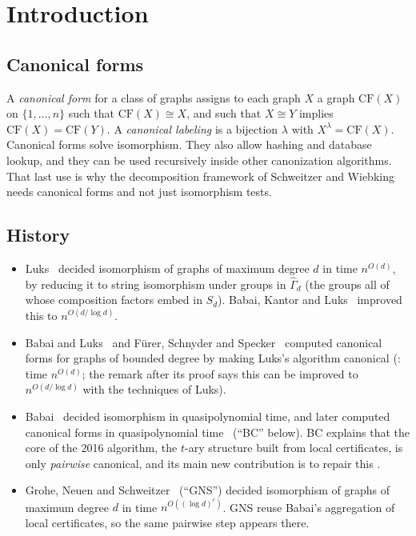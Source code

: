 \documentclass[11pt]{article}
\theoremstyle{plain}
\theoremstyle{definition}
\theoremstyle{remark}
\theoremstyle{named}
\theoremstyle{namedrm}
\newcommand{\Gd}{\widehat{\Gamma}_d}
\begin{document}
\tableofcontents

\section{Introduction}\label{sec:intro}

\subsection{Canonical forms}

A \emph{canonical form} for a class of graphs assigns to each graph $X$ a graph $\mathrm{CF}(X)$ on
$\{1,\dots,n\}$ such that $\mathrm{CF}(X)\cong X$, and such that $X\cong Y$ implies
$\mathrm{CF}(X)=\mathrm{CF}(Y)$. A \emph{canonical labeling} is a bijection $\lambda$ with
$X^\lambda=\mathrm{CF}(X)$. Canonical forms solve isomorphism. They also allow hashing and database
lookup, and they can be used recursively inside other canonization algorithms. That last use is why the
decomposition framework of Schweitzer and Wiebking~\cite{SW19,Wie21} needs canonical forms and not
just isomorphism tests.

\subsection{History}

\begin{itemize}
\item Luks~\cite{Luks82} decided isomorphism of graphs of maximum degree $d$ in time $n^{O(d)}$, by
  reducing it to string isomorphism under groups in $\Gd$ (the groups all of whose composition factors
  embed in $S_d$). Babai, Kantor and Luks~\cite{BKL83} improved this to $n^{O(d/\log d)}$.
\item Babai and Luks~\cite{BL83} and Fürer, Schnyder and Specker~\cite{FSS83} computed canonical forms
  for graphs of bounded degree by making Luks's algorithm canonical (\cite[Thm.~4.2]{BL83}: time
  $n^{O(d)}$; the remark after its proof says this can be improved to $n^{O(d/\log d)}$ with the
  techniques of Luks).
\item Babai~\cite{Bab16,Bab15} decided isomorphism in quasipolynomial time, and later computed
  canonical forms in quasipolynomial time~\cite{Bab19} (``BC'' below). BC explains that the core of
  the 2016 algorithm, the $t$-ary structure built from local certificates, is only \emph{pairwise}
  canonical, and its main new contribution is to repair this \cite[Thm.~12.1]{Bab19}.
\item Grohe, Neuen and Schweitzer~\cite{GNS} (``GNS'') decided isomorphism of graphs of maximum degree
  $d$ in time $n^{O((\log d)^c)}$. GNS reuse Babai's aggregation of local certificates, so the same
  pairwise step appears there.
\end{itemize}
\end{document}
